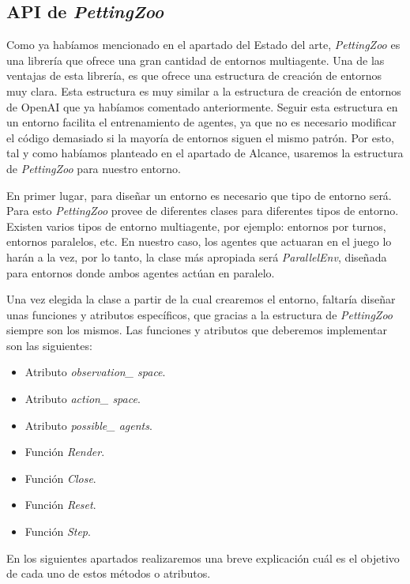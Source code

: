 \subsection{API de \textit{PettingZoo}}

Como ya habíamos mencionado en el apartado del Estado del arte, \textit{PettingZoo} es una librería que ofrece una gran cantidad de entornos multiagente. Una de las ventajas de esta librería, es que ofrece una estructura de creación de entornos muy clara. Esta estructura es muy similar a la estructura de creación de entornos de OpenAI que ya habíamos comentado anteriormente. Seguir esta estructura en un entorno facilita el entrenamiento de agentes, ya que no es necesario modificar el código demasiado si la mayoría de entornos siguen el mismo patrón. Por esto, tal y como habíamos planteado en el apartado de Alcance, usaremos la estructura de \textit{PettingZoo} para nuestro entorno.

En primer lugar, para diseñar un entorno es necesario que tipo de entorno será. Para esto \textit{PettingZoo} provee de diferentes clases para diferentes tipos de entorno. Existen varios tipos de entorno multiagente, por ejemplo: entornos por turnos, entornos paralelos, etc. En nuestro caso, los agentes que actuaran en el juego lo harán a la vez, por lo tanto, la clase más apropiada será \textit{ParallelEnv}, diseñada para entornos donde ambos agentes actúan en paralelo.

Una vez elegida la clase a partir de la cual crearemos el entorno, faltaría diseñar unas funciones y atributos específicos, que gracias a la estructura de \textit{PettingZoo} siempre son los mismos. Las funciones y atributos que deberemos implementar son las siguientes:

\begin{itemize}
    \item Atributo \textit{observation\_ space}.
    \item Atributo \textit{action\_ space}.
    \item Atributo \textit{possible\_ agents}.
    \item Función \textit{Render}.
    \item Función \textit{Close}.
    \item Función \textit{Reset}.
    \item Función \textit{Step}.
\end{itemize}

En los siguientes apartados realizaremos una breve explicación cuál es el objetivo de cada uno de estos métodos o atributos.

